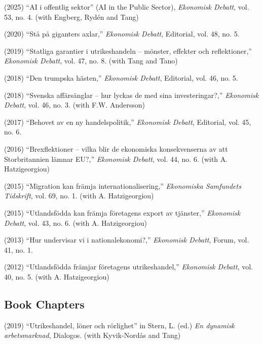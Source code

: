\documentclass[11pt,a4paper]{article}
\newcommand{\publication}[1]{\item #1}
\begin{document}
\begin{enumerate}[label={[\arabic*]}]

\publication{(2025) ``AI i offentlig sektor'' (AI in the Public Sector), \textit{Ekonomisk Debatt}, vol. 53, no. 4. (with Engberg, Rydén and Tang)}

\publication{(2020) ``Stå på giganters axlar,'' \textit{Ekonomisk Debatt}, Editorial, vol. 48, no. 5.}

\publication{(2019) ``Statliga garantier i utrikeshandeln -- mönster, effekter och reflektioner,'' \textit{Ekonomisk Debatt}, vol. 47, no. 8. (with Tang and Tano)}

\publication{(2018) ``Den trumpska hästen,'' \textit{Ekonomisk Debatt}, Editorial, vol. 46, no. 5.}

\publication{(2018) ``Svenska affärsänglar -- hur lyckas de med sina investeringar?,'' \textit{Ekonomisk Debatt}, vol. 46, no. 3. (with F.W. Andersson)}

\publication{(2017) ``Behovet av en ny handelspolitik,'' \textit{Ekonomisk Debatt}, Editorial, vol. 45, no. 6.}

\publication{(2016) ``Brexflektioner -- vilka blir de ekonomiska konsekvenserna av att Storbritannien lämnar EU?,'' \textit{Ekonomisk Debatt}, vol. 44, no. 6. (with A. Hatzigeorgiou)}

\publication{(2015) ``Migration kan främja internationalisering,'' \textit{Ekonomiska Samfundets Tidskrift}, vol. 69, no. 1. (with A. Hatzigeorgiou)}

\publication{(2015) ``Utlandsfödda kan främja företagens export av tjänster,'' \textit{Ekonomisk Debatt}, vol. 43, no. 6. (with A. Hatzigeorgiou)}

\publication{(2013) ``Hur undervisar vi i nationalekonomi?,'' \textit{Ekonomisk Debatt}, Forum, vol. 41, no. 1.}

\publication{(2012) ``Utlandsfödda främjar företagens utrikeshandel,'' \textit{Ekonomisk Debatt}, vol. 40, no. 5. (with A. Hatzigeorgiou)}

\end{enumerate}

\subsection{Book Chapters}

\begin{enumerate}[label={[\arabic*]}]

\publication{(2019) ``Utrikeshandel, löner och rörlighet'' in Stern, L. (ed.) \textit{En dynamisk arbetsmarknad}, Dialogos. (with Kyvik-Nordås and Tang)}

\end{enumerate}
\end{document}
